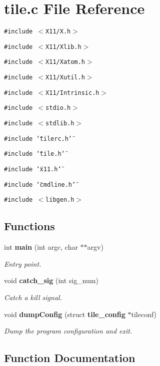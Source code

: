 \section{tile.c File Reference}
\label{tile_8c}
{\tt \#include $<$X11/X.h$>$}\par
{\tt \#include $<$X11/Xlib.h$>$}\par
{\tt \#include $<$X11/Xatom.h$>$}\par
{\tt \#include $<$X11/Xutil.h$>$}\par
{\tt \#include $<$X11/Intrinsic.h$>$}\par
{\tt \#include $<$stdio.h$>$}\par
{\tt \#include $<$stdlib.h$>$}\par
{\tt \#include \char`\"{}tilerc.h\char`\"{}}\par
{\tt \#include \char`\"{}tile.h\char`\"{}}\par
{\tt \#include \char`\"{}x11.h\char`\"{}}\par
{\tt \#include \char`\"{}cmdline.h\char`\"{}}\par
{\tt \#include $<$libgen.h$>$}\par
\subsection*{Functions}
\begin{CompactItemize}
\item 
int {\bf main} (int argc, char $\ast$$\ast$argv)
\begin{CompactList}\small\item\em Entry point. \item\end{CompactList}\item 
void {\bf catch\_\-sig} (int sig\_\-num)
\begin{CompactList}\small\item\em Catch a kill signal. \item\end{CompactList}\item 
void {\bf dump\-Config} (struct {\bf tile\_\-config} $\ast$tileconf)
\begin{CompactList}\small\item\em Dump the program configuration and exit. \item\end{CompactList}\end{CompactItemize}


\subsection{Function Documentation}
